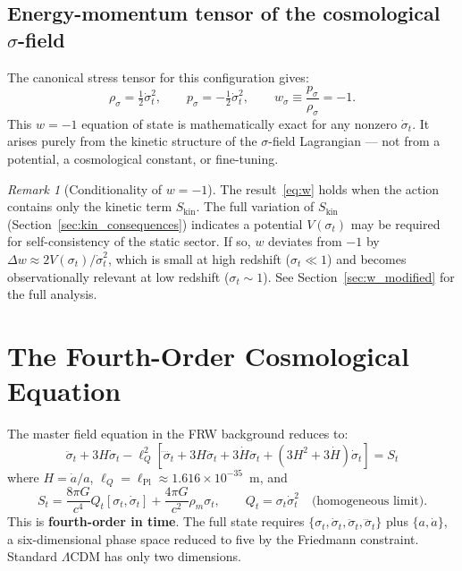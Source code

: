 \documentclass[11pt,a4paper]{article}
\theoremstyle{plain}
\theoremstyle{definition}
\theoremstyle{remark}
\newtheorem{remark}{Remark}[section]
\newcommand{\lQ}{\ell_Q}
\newcommand{\dotv}{\dot\sigma_t}
\begin{document}
\subsection{Energy-momentum tensor of the cosmological $\sigma$-field}

The canonical stress tensor for this configuration gives:
\begin{equation}
  \rho_\sigma = \tfrac{1}{2}\dotv^2, \qquad
  p_\sigma = -\tfrac{1}{2}\dotv^2, \qquad
  \boxed{w_\sigma \equiv \frac{p_\sigma}{\rho_\sigma} = -1.}
  \label{eq:w}
\end{equation}
This $w=-1$ equation of state is mathematically exact for any nonzero
$\dotv$.  It arises purely from the kinetic structure of the
$\sigma$-field Lagrangian --- not from a potential, a cosmological
constant, or fine-tuning.

\begin{remark}[Conditionality of $w=-1$]
\label{rem:w_conditional}
The result~\eqref{eq:w} holds when the action contains only the kinetic
term $S_{\mathrm{kin}}$.  The full variation of $S_{\mathrm{kin}}$
(Section~\ref{sec:kin_consequences}) indicates a potential
$V(\sigma_t)$ may be required for self-consistency of the static sector.
If so, $w$ deviates from $-1$ by $\Delta w \approx 2V(\sigma_t)/\dotv^2$,
which is small at high redshift ($\sigma_t\ll 1$) and becomes
observationally relevant at low redshift ($\sigma_t \sim 1$).  See
Section~\ref{sec:w_modified} for the full analysis.
\end{remark}

\section{The Fourth-Order Cosmological Equation}
\label{sec:fourth_order}

The master field equation in the FRW background reduces to:
\begin{equation}
  \boxed{\ddot\sigma_t + 3H\dotv
  - \lQ^2\!\left[\ddddot\sigma_t + 3H\dddot\sigma_t
                 + 3\dot H\ddot\sigma_t
                 + (3H^2 + 3\dot H)\dotv\right] = S_t}
  \label{eq:cosmo_master}
\end{equation}
where $H = \dot a/a$, $\lQ = \ell_{\mathrm{Pl}} \approx 1.616\times10^{-35}$~m, and
\begin{equation}
  S_t = \frac{8\pi G}{c^4}Q_t[\sigma_t,\dotv]
      + \frac{4\pi G}{c^2}\rho_m\sigma_t, \qquad
  Q_t = \sigma_t\dotv^2 \quad\text{(homogeneous limit).}
\end{equation}
This is \textbf{fourth-order in time}.  The full state requires
$\{\sigma_t,\dotv,\ddot\sigma_t,\dddot\sigma_t\}$ plus $\{a,\dot a\}$,
a six-dimensional phase space reduced to five by the Friedmann
constraint.  Standard $\Lambda$CDM has only two dimensions.
\end{document}
